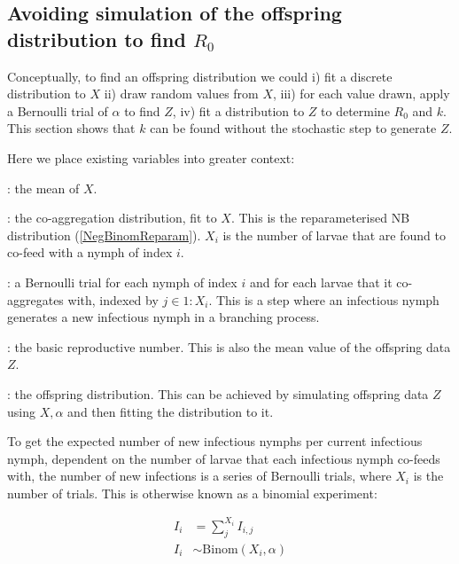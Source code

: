 \documentclass[hidelinks]{article}
\begin{document}
\subsection{Avoiding simulation of the offspring distribution to find \texorpdfstring{$ R_0 $}{R0}}

Conceptually, to find an offspring distribution we could i) fit a discrete distribution to $ X $ ii) draw random values from $ X $, iii) for each value drawn, apply a Bernoulli trial of $ \alpha $ to find $ Z $, iv) fit a distribution to $ Z $ to determine $ R_0 $ and $ k $. This section shows that $ k $ can be found without the stochastic step to generate $ Z $. 

Here we place existing variables into greater context:

\begin{description}[leftmargin=4cm, style=multiline]
	\item[$ m = \frac{1}{n} \sum_i^n L_i $] : the mean of $ X $.
	\item[$ X \sim \text{NB}(m, k) $] : the co-aggregation distribution, fit to $ X $. This is the reparameterised NB distribution (\ref{NegBinomReparam}).
	$ X_i $ is the number of larvae that are found to co-feed with a nymph of index $ i $.
	\item[$ I_{i,j} \sim \text{Bern}(p=\alpha) $] : a Bernoulli trial for each nymph of index $ i $ and for each larvae that it co-aggregates with, indexed by $ j \in 1:X_i $. This is a step where an infectious nymph generates a new infectious nymph in a branching process.
	\item[$ R_0 $] : the basic reproductive number. This is also the mean value of the offspring data $ Z $.
	\item[$ Z \sim \text{NB}(R_0, k) $] : the offspring distribution. This can be achieved by  simulating offspring data $ Z $ using $ X, \alpha $ and then fitting the distribution to it.
\end{description}

To get the expected number of new infectious nymphs per current infectious nymph, dependent on the number of larvae that each infectious nymph co-feeds with, the number of new infections is a series of Bernoulli trials, where $ X_i $ is the number of trials. This is otherwise known as a binomial experiment:

\begin{align}
    I_i &= \sum_j^{X_i} I_{i,j} \nonumber \\
    I_i &\sim \text{Binom}(X_i,\alpha)\label{BinomialExperiment}
\end{align}
\end{document}
